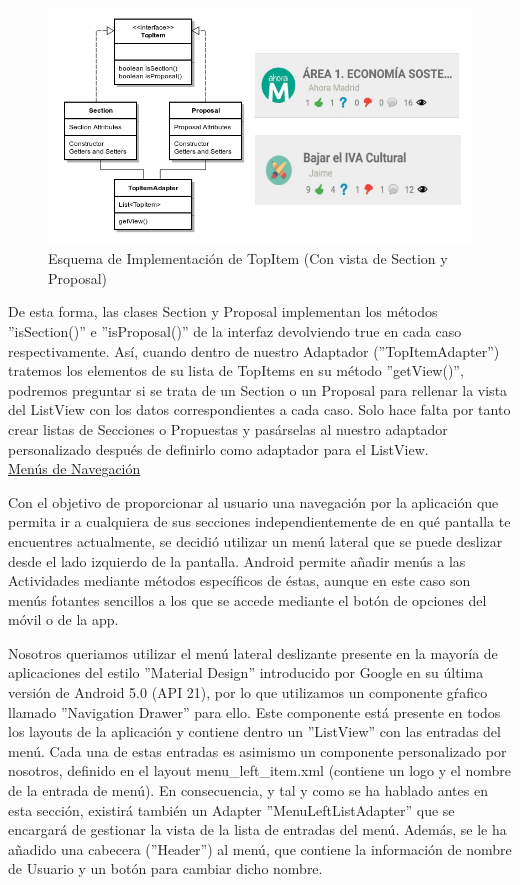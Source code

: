 	\begin{figure}[H]
	  \centering
	    \includegraphics[keepaspectratio, scale=0.6]{Media/Diagrams/classDiagramTopItemAdapter.png}
	  \caption{Esquema de Implementación de TopItem (Con vista de Section y Proposal)}
	  \label{fig:topItemArch}
	\end{figure}
	
	De esta forma, las clases Section y Proposal implementan los métodos ''isSection()'' e ''isProposal()'' de la interfaz devolviendo true en cada caso respectivamente. Así, cuando dentro de nuestro Adaptador (''TopItemAdapter'') tratemos los elementos de su lista de TopItems en su método ''getView()'', podremos preguntar si se trata de un Section o un Proposal para rellenar la vista del ListView con los datos correspondientes a cada caso. Solo hace falta por tanto crear listas de Secciones o Propuestas y pasárselas al nuestro adaptador personalizado después de definirlo como adaptador para el ListView. \\
		
		\underline{Menús de Navegación}
		
		Con el objetivo de proporcionar al usuario una navegación por la aplicación que permita ir a cualquiera de sus secciones independientemente de en qué pantalla te encuentres actualmente, se decidió utilizar un menú lateral que se puede deslizar desde el lado izquierdo de la pantalla. Android permite añadir menús \cite{ref:android_menu} a las Actividades mediante métodos específicos de éstas, aunque en este caso son menús fotantes sencillos a los que se accede mediante el botón de opciones del móvil o de la app. 
		
		Nosotros queriamos utilizar el menú lateral deslizante presente en la mayoría de aplicaciones del estilo ''Material Design'' introducido por Google en su última versión de Android 5.0 (API 21), por lo que utilizamos un componente gŕafico llamado ''Navigation Drawer'' para ello. Este componente está presente en todos los layouts de la aplicación y contiene dentro un ''ListView'' con las entradas del menú. Cada una de estas entradas es asimismo un componente personalizado por nosotros, definido en el layout menu\_left\_item.xml (contiene un logo y el nombre de la entrada de menú). En consecuencia, y tal y como se ha hablado antes en esta sección, existirá también un Adapter ''MenuLeftListAdapter'' que se encargará de gestionar la vista de la lista de entradas del menú. Además, se le ha añadido una cabecera (''Header'') al menú, que contiene la información de nombre de Usuario y un botón para cambiar dicho nombre.
		
